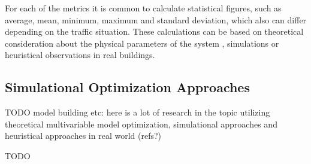 For each of the metrics it is common to calculate statistical figures, such as average, mean, minimum, maximum and standard deviation, which also can differ depending on the traffic situation.
These calculations can be based on theoretical consideration about the physical parameters of the system \autocite[][p.~194]{unger2015aufzuege}, simulations or heuristical observations in real buildings.
 



\subsection{Simulational Optimization Approaches}
TODO
model building etc: here is a lot of research in the topic utilizing theoretical multivariable model optimization, simulational approaches and heuristical approaches in real world (refs?)

\autocite[][pp.~7--11]{beers2015arrivals}
\autocite[][p.~193]{unger2015aufzuege}


TODO
